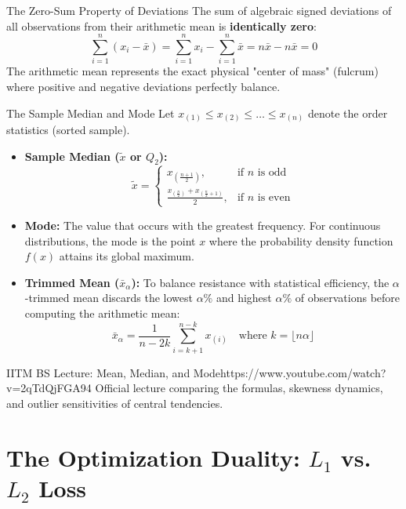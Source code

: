 \begin{theorembox}{The Zero-Sum Property of Deviations}
The sum of algebraic signed deviations of all observations from their arithmetic mean is \textbf{identically zero}:
$$\sum_{i=1}^n (x_i - \bar{x}) = \sum_{i=1}^n x_i - \sum_{i=1}^n \bar{x} = n\bar{x} - n\bar{x} = 0$$
The arithmetic mean represents the exact physical "center of mass" (fulcrum) where positive and negative deviations perfectly balance.
\end{theorembox}

\begin{definitionbox}{The Sample Median and Mode}
Let $x_{(1)} \le x_{(2)} \le \dots \le x_{(n)}$ denote the order statistics (sorted sample).
\begin{itemize}
    \item \textbf{Sample Median ($\tilde{x}$ or $Q_2$):}
    $$\tilde{x} = \begin{cases}
    x_{\left(\frac{n+1}{2}\right)}, & \text{if } n \text{ is odd} \\[8pt]
    \frac{x_{\left(\frac{n}{2}\right)} + x_{\left(\frac{n}{2} + 1\right)}}{2}, & \text{if } n \text{ is even}
    \end{cases}$$
    \item \textbf{Mode:} The value that occurs with the greatest frequency. For continuous distributions, the mode is the point $x$ where the probability density function $f(x)$ attains its global maximum.
    \item \textbf{Trimmed Mean ($\bar{x}_{\alpha}$):} To balance resistance with statistical efficiency, the $\alpha$-trimmed mean discards the lowest $\alpha\%$ and highest $\alpha\%$ of observations before computing the arithmetic mean:
    $$\bar{x}_{\alpha} = \frac{1}{n - 2k} \sum_{i=k+1}^{n-k} x_{(i)} \quad \text{where } k = \lfloor n \alpha \rfloor$$
\end{itemize}
\end{definitionbox}

\begin{videocard}{IITM BS Lecture: Mean, Median, and Mode}{https://www.youtube.com/watch?v=2qTdQjFGA94}
Official lecture comparing the formulas, skewness dynamics, and outlier sensitivities of central tendencies.
\end{videocard}

\section{The Optimization Duality: $L_1$ vs. $L_2$ Loss}

